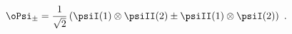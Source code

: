 \begin{equation}
  \label{eq:syp2}
  \oPsi_\pm = \frac{1}{\sqrt{2}}\left(\psiI(1)\otimes\psiII(2)\pm
    \psiII(1)\otimes\psiI(2)\right)\ .
\end{equation}


